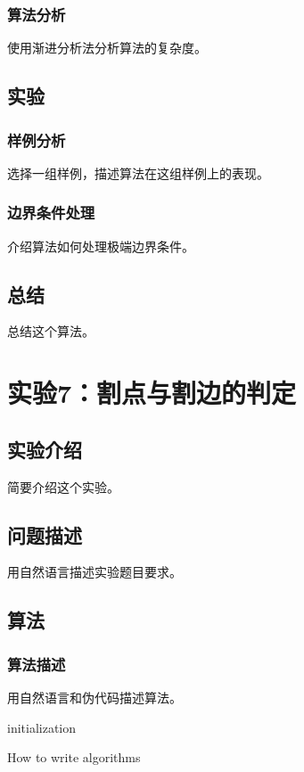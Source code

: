 \documentclass{ctexrep}
\begin{document}
\subsection{算法分析}
使用渐进分析法分析算法的复杂度。

\section{实验}
\subsection{样例分析}
选择一组样例，描述算法在这组样例上的表现。
\subsection{边界条件处理}
介绍算法如何处理极端边界条件。

\section{总结}
总结这个算法。

\chapter{实验7：割点与割边的判定}
\section{实验介绍}
简要介绍这个实验。

\section{问题描述}
用自然语言描述实验题目要求。

\section{算法}
\subsection{算法描述}
用自然语言和伪代码描述算法。
\begin{algorithm}
\SetAlgoLined
{}
 initialization\;
 \caption{How to write algorithms}
\end{algorithm}
\end{document}
